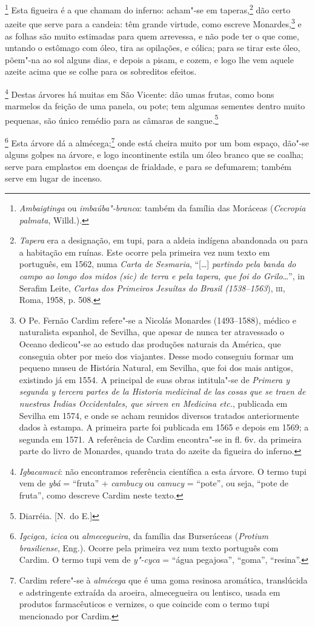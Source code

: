 \footnote{ \textit{Ambaigtinga} ou
\textit{imbaúba"-branca}: também da família das Moráceas
(\textit{Cecropia palmata}, Willd.).} Esta figueira é a
que chamam do inferno: acham"-se em taperas,\footnote{ \textit{Tapera}
era a designação, em tupi, para a aldeia indígena abandonada ou para a
habitação em ruínas. Este ocorre pela primeira vez num texto em
português, em 1562, numa \textit{Carta de Sesmaria}, ``[\ldots] 
\textit{partindo pela banda do campo ao longo dos midos (sic) de terra
e pela tapera, que foi do Grilo}\ldots'', in Serafim Leite,
\textit{Cartas dos Primeiros Jesuítas do Brasil (1538--1563}), \textsc{iii},
Roma, 1958, p. 508.} dão certo azeite que serve para a candeia: têm
grande virtude, como escreve Monardes,\footnote{ O Pe. Fernão Cardim
refere"-se a Nicolás Monardes (1493--1588), médico e naturalista espanhol, de Sevilha, 
que apesar de nunca ter atravessado o Oceano dedicou"-se ao
estudo das produções naturais da América, que conseguia obter por meio
dos viajantes. Desse modo conseguiu formar um pequeno museu de
História Natural, em Sevilha, que foi dos mais antigos, existindo já em
1554. A principal de suas obras intitula"-se de \textit{Primera y
segunda y tercera partes de la Historia medicinal de las cosas que se
traen de nuestras Indias Occidentales, que sirven en Medicina etc.}, 
publicada em Sevilha em 1574, e onde se acham reunidos diversos
tratados anteriormente dados à estampa. A primeira parte foi publicada
em 1565 e depois em 1569; a segunda em 1571. A referência de Cardim
encontra"-se in fl. 6v. da primeira parte do livro de Monardes, quando
trata do azeite da figueira do inferno.} e as folhas são muito
estimadas para quem arrevessa, e não pode ter o que come, untando o
estômago com óleo, tira as opilações, e cólica; para se tirar este
óleo, põem"-na ao sol alguns dias, e depois a pisam, e cozem, e logo lhe
vem aquele azeite acima que se colhe para os sobreditos efeitos. 

\footnote{ \textit{Igbacamuci}: não encontramos
referência científica a esta árvore. O termo tupi vem de
\textit{ybá} = ``fruta'' + \textit{cambucy} ou \textit{camucy} = ``pote'',
ou seja, ``pote de fruta'', como descreve Cardim neste texto.} 
Destas árvores há muitas em São Vicente: dão umas frutas,
como bons marmelos da feição de uma panela, ou pote; tem algumas
sementes dentro muito pequenas, são único remédio para as câmaras de sangue.\footnote{ Diarréia. [N.~do E.]}

\footnote{ \textit{Igcigca, icica} ou
\textit{almecegueira}, da família das Burseráceas (\textit{Protium
brasiliense}, Eng.). Ocorre pela primeira vez num texto português com
Cardim. O termo tupi vem de \textit{y"-cyca} = ``água pegajosa'', ``goma'',
``resina''.} Esta árvore dá a almécega;\footnote{ Cardim
refere"-se à \textit{almécega} que é uma goma resinosa aromática,
translúcida e adstringente extraída da aroeira, almecegueira ou
lentisco, usada em produtos farmacêuticos e vernizes, o que coincide
com o termo tupi mencionado por Cardim.} onde está cheira muito por um
bom espaço, dão"-se alguns golpes na árvore, e logo incontinente estila
um óleo branco que se coalha; serve para emplastos em doenças de
frialdade, e para se defumarem; também serve em lugar de incenso.

